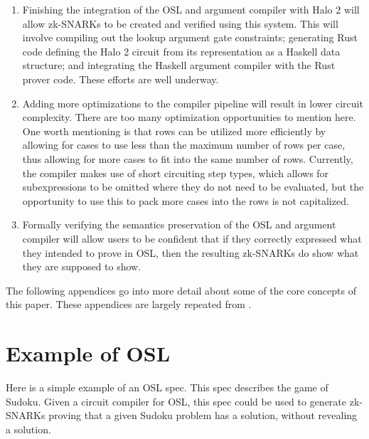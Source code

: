 \documentclass[11pt]{article}
\begin{document}
\begin{enumerate}
	\item Finishing the integration of the OSL and argument compiler with Halo 2 will allow zk-SNARKs to be created and verified using this system. This will involve compiling out the lookup argument gate constraints; generating Rust code defining the Halo 2 circuit from its representation as a Haskell data structure; and integrating the Haskell argument compiler with the Rust prover code. These efforts are well underway.
	\item Adding more optimizations to the compiler pipeline will result in lower circuit complexity. There are too many optimization opportunities to mention here. One worth mentioning is that rows can be utilized more efficiently by allowing for cases to use less than the maximum number of rows per case, thus allowing for more cases to fit into the same number of rows. Currently, the compiler makes use of short circuiting step types, which allows for subexpressions to be omitted where they do not need to be evaluated, but the opportunity to use this to pack more cases into the rows is not capitalized.
	\item Formally verifying the semantics preservation of the OSL and argument compiler will allow users to be confident that if they correctly expressed what they intended to prove in OSL, then the resulting zk-SNARKs do show what they are supposed to show.
\end{enumerate}

The following appendices go into more detail about some of the core concepts of this paper. These appendices are largely repeated from \cite{osl-paper,sigma11-poly-bounds}.

\appendix

\section{Example of OSL}

Here is a simple example of an OSL spec. This spec describes the game of
Sudoku. Given a circuit compiler for OSL, this spec could be used to
generate zk-SNARKs proving that a given Sudoku problem has a solution,
without revealing a solution.
\end{document}
